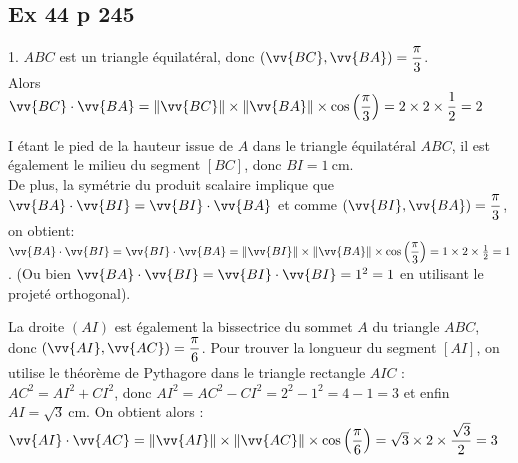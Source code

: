 \documentclass[12pt,a4paper]{book}
\begin{document}
\subsection*{Ex 44 p 245}
\begin{enumMet}
    \item 1. $A B C$ est un triangle équilatéral, donc $(\vv{B C}, \vv{B A})=\dfrac{\pi}{3}$.\\
    Alors $\vv{B C} \cdot \vv{B A}=\|\vv{B C}\| \times\|\vv{B A}\| \times \cos \left(\dfrac{\pi}{3}\right)=2 \times 2 \times \dfrac{1}{2}=2$\\
    \item I étant le pied de la hauteur issue de $A$ dans le triangle équilatéral $A B C$, il est également le milieu du segment $[B C]$, donc $B I=1 \mathrm{~cm}$.\\
De plus, la symétrie du produit scalaire implique que $\vv{B A} \cdot \vv{BI}=\vv{BI} \cdot \vv{B A}$ et comme $(\vv{B I}, \vv{B A})=\dfrac{\pi}{3}$, on obtient:\\
$\vv{B A} \cdot \vv{B I}=\vv{B I} \cdot \vv{B A}=\|\vv{B I}\| \times\|\vv{B A}\| \times \cos \left(\dfrac{\pi}{3}\right)=1 \times 2 \times \frac{1}{2}=1$.
(Ou bien $\vv{B A} \cdot \vv{B I}=\vv{B I} \cdot \vv{B I}=1^{2}=1$ en utilisant le projeté orthogonal).
\item La droite $(A I)$ est également la bissectrice du sommet $A$ du triangle $A B C$, donc $(\vv{A I}, \vv{A C})=\dfrac{\pi}{6}$. Pour trouver la longueur du segment $[A I]$, on utilise le théorème de Pythagore dans le triangle rectangle $A I C$ :
$A C^{2}=A I^{2}+C I^{2}$, donc $A I^{2}=A C^{2}-C I^{2}=2^{2}-1^{2}=4-1=3$ et enfin $A I=\sqrt{3} \mathrm{~cm}$. On obtient alors :\\
$\vv{A I} \cdot \vv{A C}=\|\vv{A I}\| \times\|\vv{A C}\| \times \cos \left(\dfrac{\pi}{6}\right)=\sqrt{3} \times 2 \times \dfrac{\sqrt{3}}{2}=3$
\end{enumMet}
\end{document}
